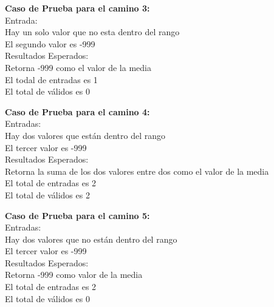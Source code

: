 \documentclass[a4paper,12pt]{article}
\begin{document}
\textbf{Caso de Prueba para el camino 3:} \\
Entrada: \\
\hspace*{1cm} Hay un solo valor que no esta dentro del rango \\
\hspace*{1cm} El segundo valor es -999 \\
Resultados Esperados: \\
\hspace*{1cm} Retorna -999 como el valor de la media \\
\hspace*{1cm} El todal de entradas es 1 \\
\hspace*{1cm} El total de válidos es 0 \par

\textbf{Caso de Prueba para el camino 4:} \\
Entradas: \\
\hspace*{1cm} Hay dos valores que están dentro del rango \\
\hspace*{1cm} El tercer valor es -999 \\
Resultados Esperados: \\
\hspace*{1cm} Retorna la suma de los dos valores entre dos como el valor de la media \\
\hspace*{1cm} El total de entradas es 2 \\
\hspace*{1cm} El total de válidos es 2 \par

\textbf{Caso de Prueba para el camino 5:} \\
Entradas: \\
\hspace*{1cm} Hay dos valores que no están dentro del rango \\
\hspace*{1cm} El tercer valor es -999 \\
Resultados Esperados: \\
\hspace*{1cm} Retorna -999 como valor de la media \\
\hspace*{1cm} El total de entradas es 2 \\
\hspace*{1cm} El total de válidos es 0 \par
\end{document}
